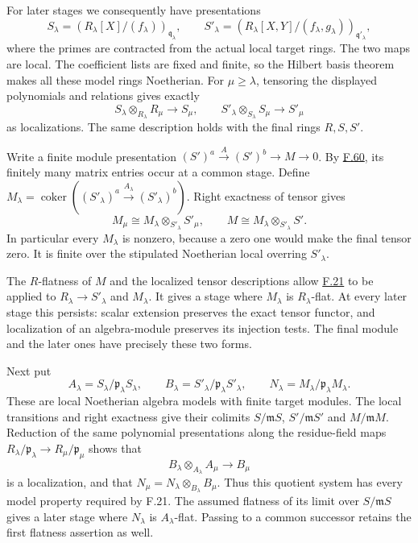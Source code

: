 \documentclass[11pt,a4paper,openany]{report}
\begin{document}
For later stages we consequently have presentations \[S_\lambda=(R_\lambda[X]/(f_\lambda))_{\mathfrak q_\lambda},\qquad
S'_\lambda=(R_\lambda[X,Y]/(f_\lambda,g_\lambda))_{\mathfrak q'_\lambda},\] where the primes are contracted from the actual local target rings. The two maps are local. The coefficient lists are fixed and finite, so the Hilbert basis theorem makes all these model rings Noetherian. For \(\mu\geq\lambda\), tensoring the displayed polynomials and relations gives exactly \[S_\lambda\otimes_{R_\lambda}R_\mu\longrightarrow S_\mu,\qquad
S'_\lambda\otimes_{S_\lambda}S_\mu\longrightarrow S'_\mu\] as localizations. The same description holds with the final rings \(R,S,S'\).

Write a finite module presentation \((S')^a\xrightarrow{A}(S')^b\to M\to0\). By \hyperref[AG-RG-S05-algebra-lemma-limit-module-essentially-finite-presentation]{F.60}, its finitely many matrix entries occur at a common stage. Define \(M_\lambda=\operatorname{coker}((S'_\lambda)^a\xrightarrow{A_\lambda}(S'_\lambda)^b)\). Right exactness of tensor gives \[M_\mu\cong M_\lambda\otimes_{S'_\lambda}S'_\mu,\qquad
M\cong M_\lambda\otimes_{S'_\lambda}S'.\] In particular every \(M_\lambda\) is nonzero, because a zero one would make the final tensor zero. It is finite over the stipulated Noetherian local overring \(S'_\lambda\).

The \(R\)-flatness of \(M\) and the localized tensor descriptions allow \hyperref[AG-RG-S05-algebra-lemma-colimit-eventually-flat]{F.21} to be applied to \(R_\lambda\to S'_\lambda\) and \(M_\lambda\). It gives a stage where \(M_\lambda\) is \(R_\lambda\)-flat. At every later stage this persists: scalar extension preserves the exact tensor functor, and localization of an algebra-module preserves its injection tests. The final module and the later ones have precisely these two forms.

Next put \[A_\lambda=S_\lambda/\mathfrak p_\lambda S_\lambda,\qquad
B_\lambda=S'_\lambda/\mathfrak p_\lambda S'_\lambda,\qquad
N_\lambda=M_\lambda/\mathfrak p_\lambda M_\lambda.\] These are local Noetherian algebra models with finite target modules. The local transitions and right exactness give their colimits \(S/\mathfrak mS\), \(S'/\mathfrak mS'\) and \(M/\mathfrak mM\). Reduction of the same polynomial presentations along the residue-field maps \(R_\lambda/\mathfrak p_\lambda\to R_\mu/\mathfrak p_\mu\) shows that \[B_\lambda\otimes_{A_\lambda}A_\mu\longrightarrow B_\mu\] is a localization, and that \(N_\mu=N_\lambda\otimes_{B_\lambda}B_\mu\). Thus this quotient system has every model property required by F.21. The assumed flatness of its limit over \(S/\mathfrak mS\) gives a later stage where \(N_\lambda\) is \(A_\lambda\)-flat. Passing to a common successor retains the first flatness assertion as well.
\end{document}
